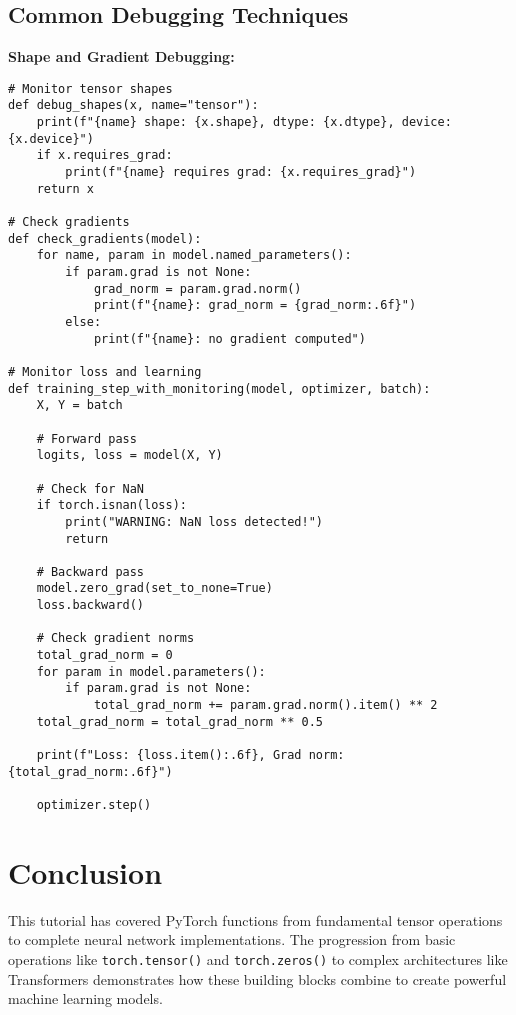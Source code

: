 \documentclass[11pt,a4paper]{book}
\begin{document}
\section{Common Debugging Techniques}

\textbf{Shape and Gradient Debugging:}
\begin{verbatim}
# Monitor tensor shapes
def debug_shapes(x, name="tensor"):
    print(f"{name} shape: {x.shape}, dtype: {x.dtype}, device: {x.device}")
    if x.requires_grad:
        print(f"{name} requires grad: {x.requires_grad}")
    return x

# Check gradients
def check_gradients(model):
    for name, param in model.named_parameters():
        if param.grad is not None:
            grad_norm = param.grad.norm()
            print(f"{name}: grad_norm = {grad_norm:.6f}")
        else:
            print(f"{name}: no gradient computed")

# Monitor loss and learning
def training_step_with_monitoring(model, optimizer, batch):
    X, Y = batch
    
    # Forward pass
    logits, loss = model(X, Y)
    
    # Check for NaN
    if torch.isnan(loss):
        print("WARNING: NaN loss detected!")
        return
    
    # Backward pass
    model.zero_grad(set_to_none=True)
    loss.backward()
    
    # Check gradient norms
    total_grad_norm = 0
    for param in model.parameters():
        if param.grad is not None:
            total_grad_norm += param.grad.norm().item() ** 2
    total_grad_norm = total_grad_norm ** 0.5
    
    print(f"Loss: {loss.item():.6f}, Grad norm: {total_grad_norm:.6f}")
    
    optimizer.step()
\end{verbatim}

\chapter{Conclusion}

This tutorial has covered PyTorch functions from fundamental tensor operations to complete neural network implementations. The progression from basic operations like \texttt{torch.tensor()} and \texttt{torch.zeros()} to complex architectures like Transformers demonstrates how these building blocks combine to create powerful machine learning models.
\end{document}
